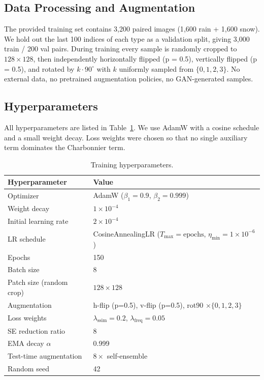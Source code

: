 \documentclass[12pt, a4paper]{article}
\begin{document}
\subsection{Data Processing and Augmentation}
The provided training set contains 3{,}200 paired images (1{,}600 rain + 1{,}600 snow). We hold out the last 100 indices of each type as a validation split, giving 3{,}000 train / 200 val pairs. During training every sample is randomly cropped to $128{\times}128$, then independently horizontally flipped (p = 0.5), vertically flipped (p = 0.5), and rotated by $k{\cdot}90^{\circ}$ with $k$ uniformly sampled from $\{0, 1, 2, 3\}$. No external data, no pretrained augmentation policies, no GAN-generated samples.

\subsection{Hyperparameters}
\label{sec:hparam}
All hyperparameters are listed in Table~\ref{tab:hparam}. We use AdamW with a cosine schedule and a small weight decay. Loss weights were chosen so that no single auxiliary term dominates the Charbonnier term.

\begin{table}[H]
    \centering
    \small
    \begin{tabular}{ll}
        \toprule
        \textbf{Hyperparameter} & \textbf{Value} \\
        \midrule
        Optimizer & AdamW ($\beta_1{=}0.9$, $\beta_2{=}0.999$) \\
        Weight decay & $1{\times}10^{-4}$ \\
        Initial learning rate & $2{\times}10^{-4}$ \\
        LR schedule & CosineAnnealingLR ($T_{\max}{=}\text{epochs}$, $\eta_{\min}{=}1{\times}10^{-6}$) \\
        Epochs & 150 \\
        Batch size & 8 \\
        Patch size (random crop) & $128{\times}128$ \\
        Augmentation & h-flip (p=0.5), v-flip (p=0.5), rot90 $\times \{0,1,2,3\}$ \\
        Loss weights & $\lambda_{\text{ssim}}=0.2$, $\lambda_{\text{freq}}=0.05$ \\
        SE reduction ratio & 8 \\
        EMA decay $\alpha$ & 0.999 \\
        Test-time augmentation & $8\times$ self-ensemble \\
        Random seed & 42 \\
        \bottomrule
    \end{tabular}
    \caption{Training hyperparameters.}
    \label{tab:hparam}
\end{table}
\end{document}
